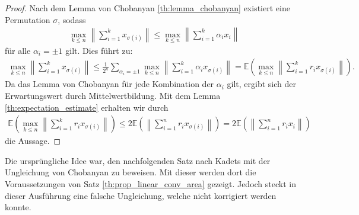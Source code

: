 \begin{proof}
	Nach dem Lemma von Chobanyan \ref{th:lemma_chobanyan} existiert eine Permutation $ \sigma $, sodass
	\begin{align*}
		\max\limits_{k \leq n}
		\left\|
		\sum \limits_{i = 1}^k x_{\sigma(i)}
		\right\|
		\leq 
		\max \limits_{k \leq n}
		\left\|
		\sum \limits_{i=1}^k \alpha_i x_i
		\right\|
	\end{align*}
	für alle $ \alpha_i =\pm 1   $ gilt. Dies führt zu:
	\begin{align*}
		\max\limits_{k \leq n}
		\left\|
		\sum \limits_{i = 1}^k x_{\sigma(i)}
		\right\|
		\leq
		\frac{1}{2^n}
		\sum \limits_{\alpha_i  =\pm  1}  
		\max \limits_{k \leq n }
		\left\|
		\sum \limits_{i=1}^k \alpha_i x_{\sigma(i)}
		\right\|
		= 
		\mathbb{E}
		\left(
		\max \limits_{k \leq n}
		\left\|
		\sum \limits_{i=1}^k r_i x_{\sigma(i)}
		\right\|
		\right).
	\end{align*}
	Da das Lemma von Chobanyan für jede Kombination der $ \alpha_i $ gilt, ergibt sich der Erwartungswert durch Mittelwertbildung.
	Mit dem Lemma \ref{th:expectation_estimate} erhalten wir durch
	\begin{align*}
		\mathbb{E}
		\left(
		\max \limits_{k \leq n}
		\left\|
		\sum \limits_{i=1}^k r_i x_{\sigma(i)}
		\right\|
		\right)
		\leq 
		2 
		\mathbb{E}
		\left(
		\left\|
		\sum \limits_{i=1}^n r_i x_{\sigma(i)}
		\right\|
		\right)
		=
		2 
		\mathbb{E}
		\left(
		\left\|
		\sum \limits_{i=1}^n r_i x_{i}
		\right\|
		\right)
	\end{align*}
	die Aussage.
\end{proof}


Die ursprüngliche Idee war, den nachfolgenden Satz nach Kadets\cite{Kadets1997} mit der Ungleichung von Chobanyan zu beweisen.
Mit dieser werden dort die Voraussetzungen von Satz \ref{th:prop_linear_conv_area} gezeigt. Jedoch steckt in dieser Ausführung eine falsche Ungleichung, welche nicht korrigiert werden konnte.


